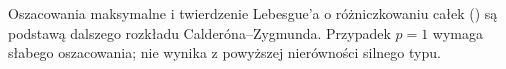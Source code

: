 \begin{uwaga}
Oszacowania maksymalne i twierdzenie Lebesgue'a
o różniczkowaniu całek
()
są podstawą dalszego rozkładu Calderóna--Zygmunda.
Przypadek $p=1$ wymaga słabego oszacowania;
nie wynika z powyższej nierówności silnego typu.
\end{uwaga}
